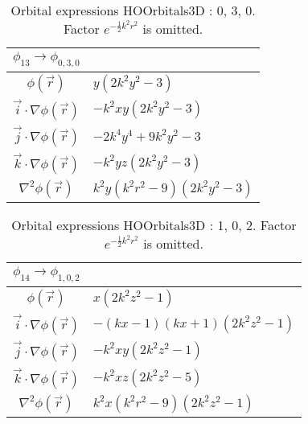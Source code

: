 \begin{table}
\begin{center}
\begin{tabular}{c|l}
$\phi_{13} \rightarrow \phi_{0, 3, 0}$\\
\hline
$\phi(\vec r)$ & $y \left(2 k^{2} y^{2} -3\right)$\\
\hline
$\vec i\cdot \nabla \phi(\vec r)$ & $- k^{2} x y \left(2 k^{2} y^{2} -3\right)$\\
$\vec j\cdot \nabla \phi(\vec r)$ & $- 2 k^{4} y^{4} + 9 k^{2} y^{2} -3$\\
$\vec k\cdot \nabla \phi(\vec r)$ & $- k^{2} y z \left(2 k^{2} y^{2} -3\right)$\\
\hline
$\nabla^2 \phi(\vec r)$ & $k^{2} y \left(k^{2} r^{2} -9\right) \left(2 k^{2} y^{2} -3\right)$\\
\end{tabular}
\caption{Orbital expressions HOOrbitals3D : 0, 3, 0. Factor $e^{- \frac{1}{2} k^{2} r^{2}}$ is omitted.}
\end{center}
\end{table}


\begin{table}
\begin{center}
\begin{tabular}{c|l}
$\phi_{14} \rightarrow \phi_{1, 0, 2}$\\
\hline
$\phi(\vec r)$ & $x \left(2 k^{2} z^{2} -1\right)$\\
\hline
$\vec i\cdot \nabla \phi(\vec r)$ & $- \left(k x -1\right) \left(k x + 1\right) \left(2 k^{2} z^{2} -1\right)$\\
$\vec j\cdot \nabla \phi(\vec r)$ & $- k^{2} x y \left(2 k^{2} z^{2} -1\right)$\\
$\vec k\cdot \nabla \phi(\vec r)$ & $- k^{2} x z \left(2 k^{2} z^{2} -5\right)$\\
\hline
$\nabla^2 \phi(\vec r)$ & $k^{2} x \left(k^{2} r^{2} -9\right) \left(2 k^{2} z^{2} -1\right)$\\
\end{tabular}
\caption{Orbital expressions HOOrbitals3D : 1, 0, 2. Factor $e^{- \frac{1}{2} k^{2} r^{2}}$ is omitted.}
\end{center}
\end{table}

\clearpage

